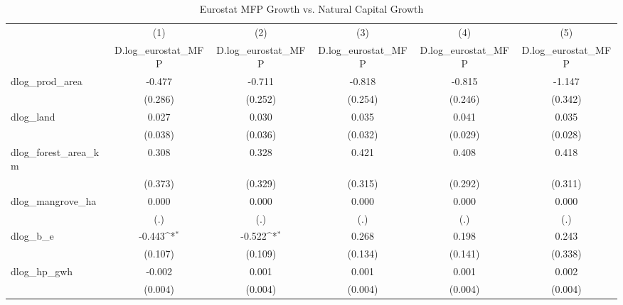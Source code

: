 \begin{table}[htbp]\centering
\def\sym#1{\ifmmode^{#1}\else\(^{#1}\)\fi}
\caption{Eurostat MFP Growth vs. Natural Capital Growth}
\begin{tabular}{l*{5}{c}}
\hline\hline
            &\multicolumn{1}{c}{(1)}&\multicolumn{1}{c}{(2)}&\multicolumn{1}{c}{(3)}&\multicolumn{1}{c}{(4)}&\multicolumn{1}{c}{(5)}\\
            &\multicolumn{1}{c}{D.log\_eurostat\_MFP}&\multicolumn{1}{c}{D.log\_eurostat\_MFP}&\multicolumn{1}{c}{D.log\_eurostat\_MFP}&\multicolumn{1}{c}{D.log\_eurostat\_MFP}&\multicolumn{1}{c}{D.log\_eurostat\_MFP}\\
\hline
dlog\_prod\_area&      -0.477       &      -0.711       &      -0.818       &      -0.815       &      -1.147       \\
            &     (0.286)       &     (0.252)       &     (0.254)       &     (0.246)       &     (0.342)       \\
[1em]
dlog\_land   &       0.027       &       0.030       &       0.035       &       0.041       &       0.035       \\
            &     (0.038)       &     (0.036)       &     (0.032)       &     (0.029)       &     (0.028)       \\
[1em]
dlog\_forest\_area\_km&       0.308       &       0.328       &       0.421       &       0.408       &       0.418       \\
            &     (0.373)       &     (0.329)       &     (0.315)       &     (0.292)       &     (0.311)       \\
[1em]
dlog\_mangrove\_ha&       0.000       &       0.000       &       0.000       &       0.000       &       0.000       \\
            &         (.)       &         (.)       &         (.)       &         (.)       &         (.)       \\
[1em]
dlog\_b\_e    &      -0.443\sym{*}&      -0.522\sym{*}&       0.268       &       0.198       &       0.243       \\
            &     (0.107)       &     (0.109)       &     (0.134)       &     (0.141)       &     (0.338)       \\
[1em]
dlog\_hp\_gwh &      -0.002       &       0.001       &       0.001       &       0.001       &       0.002       \\
            &     (0.004)       &     (0.004)       &     (0.004)       &     (0.004)       &     (0.004)       \\

\end{tabular}
\end{table}
